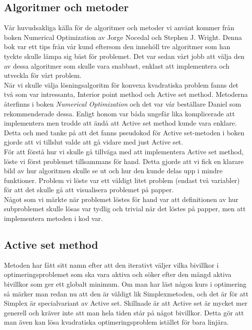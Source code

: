 \subsection{Algoritmer och metoder}
Vår huvudsakliga källa för de algoritmer och metoder vi använt kommer från boken Numerical Optimization av Jorge Nocedal och Stephen J. Wright. Denna bok var ett tips från vår kund eftersom den innehöll tre algoritmer som han tyckte skulle lämpa sig bäst för problemet. Det var sedan vårt jobb att välja den av dessa algoritmer som skulle vara snabbast, enklast att implementera och utveckla för vårt problem.
\\
När vi skulle välja lösningsalgoritm för konvexa kvadratiska problem fanns det två som var intressanta, Interior point method och Active set method. Metoderna återfinns i boken \emph{Numerical Optimization} och det var vår beställare Daniel som rekommenderade dessa. Enligt honom var båda ungefär lika komplicerade att implementera men trodde att ändå att Active set method kunde vara enklare. Detta och med tanke på att det fanns pseudokod för Active set-metoden i boken gjorde att vi tillslut valde att gå vidare med just Active set. 
\\
För att förstå hur vi skulle gå tillväga med att implementera Active set method, löste vi först problemet tillsammans för hand. Detta gjorde att vi fick en klarare bild av hur algoritmen skulle se ut och hur den kunde delas upp i mindre funktioner. Problem vi löste var ett väldigt litet problem (endast två variabler) för att det skulle gå att visualisera problemet på papper. \\
Något som vi märkte när problemet löstes för hand var att definitionen av hur subproblemet skulle lösas var tydlig och trivial när det löstes på papper, men att implementera metoden i kod var. 

\subsection{Active set method}   
Metoden har fått sitt namn efter att den iterativt väljer vilka bivillkor i optimeringsproblemet som ska vara aktiva och söker efter den mängd aktiva bivillkor som ger ett globalt minimum. Om man har läst någon kurs i optimering så märker man redan nu att den är väldigt lik Simplexmetoden, och det är för att Simplex är specialvariant av Active set. Skillnade är att Active set är mycket mer generell och kräver inte att man hela tiden står på något bivillkor. Detta gör att man även kan lösa kvadratiska optimeringsproblem istället för bara linjära. 


